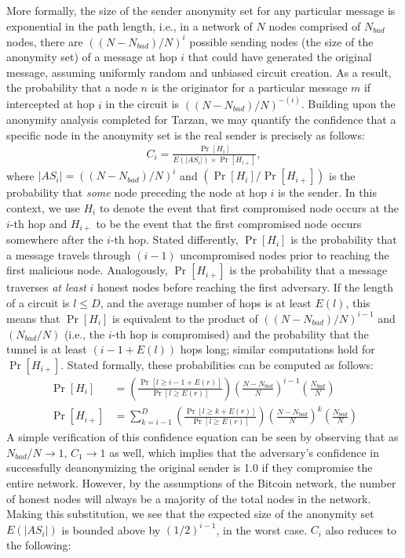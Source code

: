 More formally, the size of the sender anonymity set for any particular message is exponential in the path length, i.e., in a network of $N$ nodes comprised of $N_{bad}$ nodes, there are $((N - N_{bad}) / N)^{i}$ possible sending nodes (the size of the anonymity set) of a message at hop $i$ that could have generated the original message, assuming uniformly random and unbiased circuit creation. As a result, the probability that a node $n$ is the originator for a particular message $m$ if intercepted at hop $i$ in the circuit is $((N - N_{bad}) / N)^{-(i)}$. Building upon the anonymity analysis completed for Tarzan, we may quantify the confidence that a specific node in the anonymity set is the real sender is precisely as follows:
\begin{align*}
C_i = \frac{\Pr[H_i]}{E(|AS_i|) \times \Pr[H_{i+}]},
\end{align*} 
where $|AS_i| = ((N - N_{bad}) / N)^{i}$ and $(\Pr[H_i] / \Pr[H_{i+}])$ is the probability that \emph{some} node preceding the node at hop $i$ is the sender. In this context, we use $H_i$ to denote the event that first compromised node occurs at the $i$-th hop and $H_{i+}$ to be the event that the first compromised node occurs somewhere after the $i$-th hop. Stated differently, $\Pr[H_i]$ is the probability that a message travels through $(i-1)$ uncompromised nodes prior to reaching the first malicious node. Analogously, $\Pr[H_{i+}]$ is the probability that a message traverses \emph{at least} $i$ honest nodes before reaching the first adversary. If the length of a circuit is $l \leq D$, and the average number of hops is at least $E(l)$, this means that $\Pr[H_i]$ is equivalent to the product of $((N - N_{bad}) / N)^{i-1}$ and $(N_{bad} / N)$ (i.e., the $i$-th hop is compromised) and the probability that the tunnel is at least $(i-1 + E(l))$ hops long; similar computations hold for $\Pr[H_{i+}]$. Stated formally, these probabilities can be computed as follows:
\begin{align*}
\Pr[H_i] & = \left( \frac{ \Pr[l \geq i - 1 + E(r)] } { \Pr[l \geq E(r)] }\right) \left(\frac{N - N_{bad}}{N}\right)^{i-1} \left( \frac{N_{bad}}{N}\right) \\
\Pr[H_{i+}] & = \sum_{k=i-1}^{D} \left( \frac{ \Pr[l \geq k + E(r)] } { \Pr[l \geq E(r)] }\right) \left(\frac{N - N_{bad}}{N}\right)^{k} \left( \frac{N_{bad}}{N}\right)
\end{align*}
A simple verification of this confidence equation can be seen by observing that as $N_{bad}/N \to 1$,  $C_1 \to 1$ as well, which implies that the adversary's confidence in successfully deanonymizing the original sender is 1.0 if they compromise the entire network. However, by the assumptions of the Bitcoin network, the number of honest nodes will always be a majority of the total nodes in the network. Making this substitution, we see that the expected size of the anonymity set $E(|AS_i|)$ is bounded above by $\left(1/2\right)^{i-1}$, in the worst case. $C_i$ also reduces to the following:
